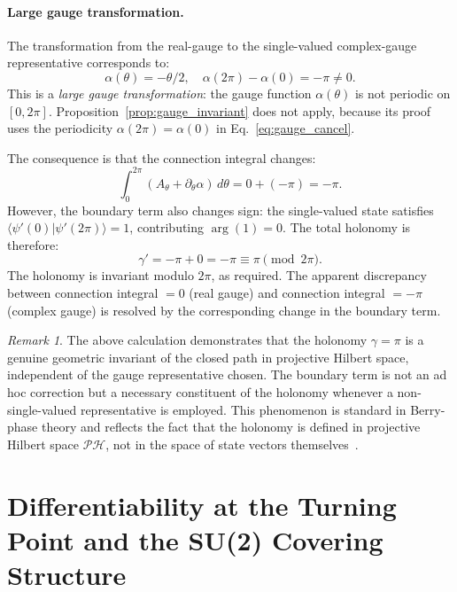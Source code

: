 \documentclass[%
 reprint,
 amsmath,amssymb,
 aps,
 prb,
]{revtex4-2}
\numberwithin{equation}{section}
\theoremstyle{definition}
\theoremstyle{remark}
\newtheorem{remark}{Remark}[section]
\begin{document}
\paragraph{Large gauge transformation.}
The transformation from the real-gauge to the single-valued complex-gauge representative corresponds to:
\begin{equation}
\alpha(\theta) = -\theta/2,
\quad
\alpha(2\pi) - \alpha(0) = -\pi \neq 0.
\label{eq:large_gauge}
\end{equation}
This is a \emph{large gauge transformation}: the gauge function $\alpha(\theta)$ is not periodic on $[0, 2\pi]$. Proposition~\ref{prop:gauge_invariant} does not apply, because its proof uses the periodicity $\alpha(2\pi) = \alpha(0)$ in Eq.~\eqref{eq:gauge_cancel}.

The consequence is that the connection integral changes:
\begin{equation}
\int_0^{2\pi} (A_\theta + \partial_\theta\alpha)\,d\theta
= 0 + (-\pi) = -\pi.
\end{equation}
However, the boundary term also changes sign: the single-valued state satisfies $\langle\psi'(0)|\psi'(2\pi)\rangle = 1$, contributing $\arg(1) = 0$. The total holonomy is therefore:
\begin{equation}
\gamma' = -\pi + 0 = -\pi \equiv \pi \pmod{2\pi}.
\label{eq:gamma_large_gauge}
\end{equation}
The holonomy is invariant modulo $2\pi$, as required. The apparent discrepancy between connection integral $= 0$ (real gauge) and connection integral $= -\pi$ (complex gauge) is resolved by the corresponding change in the boundary term.

\begin{remark}
The above calculation demonstrates that the holonomy $\gamma = \pi$
is a genuine geometric invariant of the closed path in projective
Hilbert space, independent of the gauge representative chosen.
The boundary term is not an ad hoc correction but a necessary
constituent of the holonomy whenever a non-single-valued
representative is employed.
This phenomenon is standard in Berry-phase theory and reflects the
fact that the holonomy is defined in projective Hilbert space
$\mathcal{P}\mathcal{H}$, not in the space of state vectors
themselves~\cite{Aharonov1987}.
\end{remark}


\section{Differentiability at the Turning Point and the SU(2) Covering Structure}
\label{app:su2_continuity}
\end{document}
